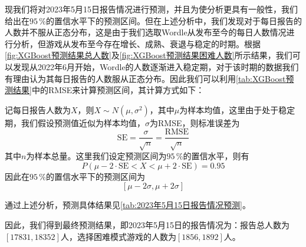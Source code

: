 \documentclass{MathModeling}
\begin{document}
现我们将对2023年5月15日报告情况进行预测，并且为使分析更具有一般性，我们给出在$95\,\%$的置信水平下的预测区间。但在上述分析中，我们发现对于每日报告的人数并不服从正态分布，这是由于我们选取Wordle从发布至今的每日人数情况进行分析，但游戏从发布至今存在增长、成熟、衰退与稳定的时期。根据\textcolor{blue}{\cref{fig:XGBoost预测结果总人数}}及\textcolor{blue}{\cref{fig:XGBoost预测结果困难人数}}所示结果，我们可以发现从2022年6月开始，Wordle的人数逐渐进入稳定期，对于该时期的数据我们有理由认为其每日报告的人数服从正态分布。因此我们可以利用\textcolor{blue}{\cref{tab:XGBoost预测结果}}中的RMSE来计算预测区间，其计算方式如下：

记每日报告人数为$X$，则$X\sim N(\mu,\sigma^2)$，其中$\mu$为样本均值，这里由于处于稳定期，我们假设预测值近似为样本均值，$\sigma$为RMSE，则标准误差为
\begin{equation}
	\text{SE}=\frac{\sigma}{\sqrt{n}}=\frac{\text{RMSE}}{\sqrt{n}}
\end{equation}
其中$n$为样本总量。这里我们设定预测区间为$95\,\%$的置信水平，则有
\begin{equation}
	P(\mu-2\cdot\text{SE} < X < \mu+2\cdot\text{SE})=0.95
\end{equation}
因此在$95\,\%$的置信水平下的预测区间为
\begin{equation}
	\left[\mu-2\sigma,\mu+2\sigma\right]
\end{equation}

通过上述分析，预测具体结果见\textcolor{blue}{\cref{tab:2023年5月15日报告情况预测}}。
\begin{table}[H]
	\centering
	\caption{2023年5月15日报告情况预测结果}
	\label{tab:2023年5月15日报告情况预测}
\end{table}

因此，我们得到最终预测结果，即2023年5月15日的报告情况为：报告总人数为$\left[17831,18352\right]$人，选择困难模式游戏的人数为$\left[1856,1892\right]$人。
\end{document}
